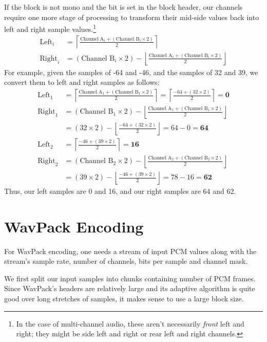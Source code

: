 If the block is not mono and the  bit is set
in the block header, our channels require one more stage of processing
to transform their mid-side values back into left and right sample
values.\footnote{In the case of multi-channel audio, these aren't
necessarily \textit{front} left and right; they might be
side left and right or rear left and right channels.}
\begin{align*}
\text{Left}_i &= \left\lceil\frac{\text{Channel A}_i + (\text{Channel B}_i \times 2)}{2}\right\rceil \\
\text{Right}_i &= (\text{Channel B}_i \times 2) - \left\lfloor\frac{\text{Channel A}_i + (\text{Channel B}_i \times 2)}{2}\right\rfloor
\end{align*}
For example, given the  samples of -64 and -46, and the
 samples of 32 and 39, we convert them to left
and right samples as follows:
\begin{align*}
\text{Left}_1 &= \left\lceil\frac{\text{Channel A}_1 + (\text{Channel B}_1 \times 2)}{2}\right\rceil = \left\lceil\frac{-64 + (32 \times 2)}{2}\right\rceil = \textbf{0} \\
\text{Right}_1 &= (\text{Channel B}_1 \times 2) - \left\lfloor\frac{\text{Channel A}_1 + (\text{Channel B}_1 \times 2)}{2}\right\rfloor \\
&= (32 \times 2) - \left\lfloor\frac{-64 + (32 \times 2)}{2}\right\rfloor = 64 - 0 = \textbf{64} \\
\text{Left}_2 &= \left\lceil\frac{-46 + (39 \times 2)}{2}\right\rceil = \textbf{16} \\
\text{Right}_2 &= (\text{Channel B}_2 \times 2) - \left\lfloor\frac{\text{Channel A}_2 + (\text{Channel B}_2 \times 2)}{2}\right\rfloor \\
&= (39 \times 2) - \left\lfloor\frac{-46 + (39 \times 2)}{2}\right\rfloor = 78 - 16 = \textbf{62}
\end{align*}
Thus, our left samples are 0 and 16, and our right samples are 64 and 62.

\clearpage

\section{WavPack Encoding}

For WavPack encoding, one needs a stream of input PCM values
along with the stream's sample rate, number of channels, bits per sample
and channel mask.

We first split our input samples into chunks containing
 number of PCM frames.
Since WavPack's headers are relatively large and its
adaptive algorithm is quite good over long stretches of samples,
it makes sense to use a large block size.


